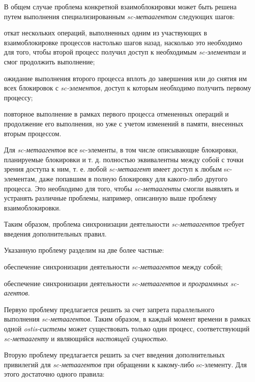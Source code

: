 В общем случае проблема конкретной взаимоблокировки может быть решена путем выполнения специализированным \textit{sc-метаагентом} следующих шагов:	
\begin{textitemize}
	\item откат нескольких операций, выполненных одним из участвующих в взаимоблокировке процессов настолько шагов назад, насколько это необходимо для того, чтобы второй процесс получил доступ к необходимым \textit{sc-элементам} и смог продолжить выполнение;
	\item ожидание выполнения второго процесса вплоть до завершения или до снятия им всех блокировок с \textit{sc-элементов}, доступ к которым необходимо получить первому процессу;
	\item повторное выполнение в рамках первого процесса отмененных операций и продолжение его выполнения, но уже с учетом изменений в памяти, внесенных вторым процессом.		
\end{textitemize}

Для \textit{sc-метаагентов} все sc-элементы, в том числе описывающие блокировки, планируемые блокировки и т. д. полностью эквивалентны между собой с точки зрения доступа к ним, т. е. любой \textit{sc-метаагент} имеет доступ к любым sc-элементам, даже попавшим в полную блокировку для какого-либо другого процесса. Это необходимо для того, чтобы \textit{sc-метаагенты} смогли выявлять и устранять различные проблемы, например, описанную выше проблему взаимоблокировки.

Таким образом, проблема синхронизации деятельности \textit{sc-метаагентов} требует введения дополнительных правил.

Указанную проблему разделим на две более частные:
\begin{textitemize}
	\item обеспечение синхронизации деятельности \textit{sc-метаагентов} между собой;
	\item обеспечение синхронизации деятельности \textit{sc-метаагентов} и \textit{программных sc-агентов}.		
\end{textitemize}

Первую проблему предлагается решить за счет запрета параллельного выполнения \textit{sc-метаагентов}. Таким образом, в каждый момент времени в рамках одной \textit{ostis-системы} может существовать только один процесс, соответствующий \textit{sc-метаагенту} и являющийся \textit{настоящей сущностью}. 

Вторую проблему предлагается решить за счет введения дополнительных привилегий для \textit{sc-метаагентов} при обращении к какому-либо sc-элементу. Для этого достаточно одного правила: 

